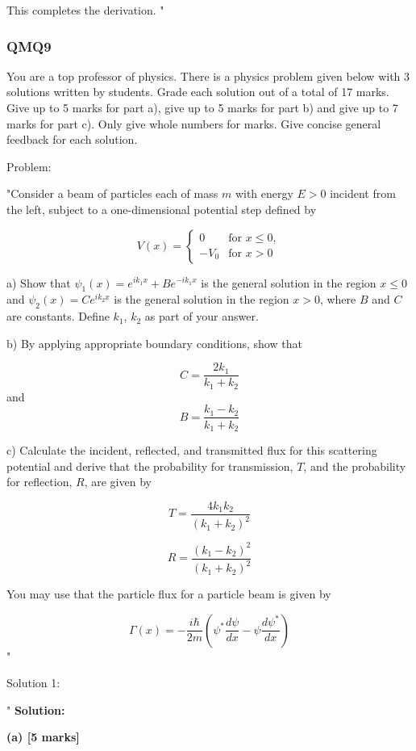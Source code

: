 This completes the derivation.
"

\subsubsection{QMQ9}

You are a top professor of physics. There is a physics problem given below with 3 solutions written by students. Grade each solution out of a total of 17 marks. Give up to 5 marks for part a), give up to 5 marks for part b) and give up to 7 marks for part c). Only give whole numbers for marks. Give concise general feedback for each solution. 

Problem:

"Consider a beam of particles each of mass \( m \) with energy \( E > 0 \) incident from the left, subject to a one-dimensional potential step defined by

\[ V(x) = \begin{cases}
0 & \text{for } x \leq 0,\\
-V_{0}  & \text{for } x > 0 
\end{cases} \]

a) Show that \( \psi_{1}(x) = e^{ik_{1}x} + Be^{-ik_{1}x} \) is the general solution in the region \( x \leq 0 \) and \( \psi_{2}(x) = Ce^{ik_{2}x} \) is the general solution in the region \( x > 0 \), where \( B \) and \( C \) are constants. Define \( k_{1} \), \( k_{2} \) as part of your answer.

b) By applying appropriate boundary conditions, show that 

\[ C = \frac{2k_{1}}{k_{1}+k_{2}} \] and \[ B = \frac{k_{1}-k_{2}}{k_{1}+k_{2}} \]

c) Calculate the incident, reflected, and transmitted flux for this scattering potential and derive that the probability for transmission, \( T \), and the probability for reflection, \( R \), are given by 

\[ T = \frac{4k_{1}k_{2}}{(k_{1}+k_{2})^{2}} \]

\[ R = \frac{(k_{1}-k_{2})^{2}}{(k_{1}+k_{2})^{2}} \]

You may use that the particle flux for a particle beam is given by 

\[ \Gamma(x) = -\frac{i\hbar}{2m} \left(\psi^{*}\frac{d\psi}{dx} - \psi\frac{d\psi^{*}}{dx} \right) \]"

Solution 1: 

"
\textbf{Solution:}

\textbf{(a) [5 marks]}

